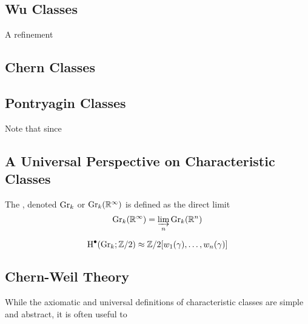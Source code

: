\subsection{Wu Classes}

A refinement 

\subsection{Chern Classes}

\subsection{Pontryagin Classes}\label{sec:pontryagin-classes}
\begin{theorem}

\end{theorem}


Note that since 

\subsection{A Universal Perspective on Characteristic Classes}\label{sec:universal-characteristic-classes} 

\begin{definition}
	The , denoted $\mathrm{Gr}_k$ or $\mathrm{Gr}_k(\mathbb{R}^\infty)$ is defined as the direct limit
	\[
		\mathrm{Gr}_k(\mathbb{R}^\infty) = \varinjlim_n \mathrm{Gr}_k(\mathbb{R}^n)
	\]
\end{definition}

\begin{theorem}
	\[
		\operatorname{H}^\bullet(\mathrm{Gr}_k; \mathbb{Z}/2) \approx \mathbb{Z}/2[w_1(\gamma), \ldots, w_n(\gamma)]
	\]
\end{theorem}

\subsection{Chern-Weil Theory}\label{sec:chern-weil-theory}

While the axiomatic and universal definitions of characteristic classes are simple and abstract, it is often useful to
